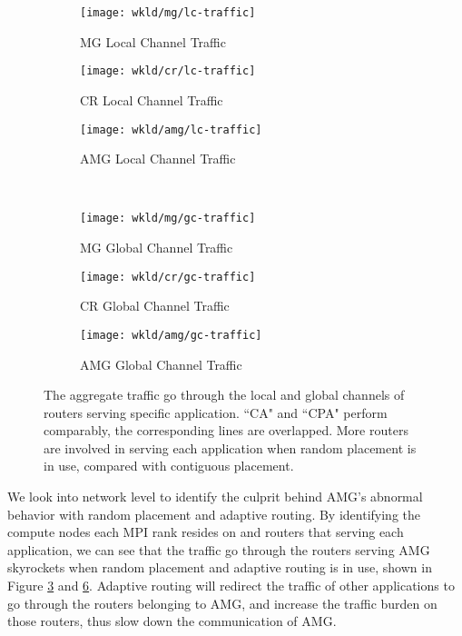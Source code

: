 \begin{figure*}[t]
    \centering
    \begin{subfigure}[t]{0.32\textwidth}
        \centering
        \texttt{[image: wkld/mg/lc-traffic]}
        \caption{MG Local Channel Traffic}
        \label{fig:mg-lc-traffic}
    \end{subfigure}\hfill
    \begin{subfigure}[t]{0.32\textwidth}
        \centering
        \texttt{[image: wkld/cr/lc-traffic]}
        \caption{CR Local Channel Traffic}
        \label{fig:cr-lc-traffic}
    \end{subfigure}\hfill
    \begin{subfigure}[t]{0.32\textwidth}
        \centering
        \texttt{[image: wkld/amg/lc-traffic]}
        \caption{AMG Local Channel Traffic}
        \label{fig:amg-lc-traffic}
    \end{subfigure}\\  
    \centering
   \begin{subfigure}[t]{0.32\textwidth}
        \centering
        \texttt{[image: wkld/mg/gc-traffic]}
        \caption{MG Global Channel Traffic}
        \label{fig:mg-gc-traffic}
    \end{subfigure}\hfill
    \begin{subfigure}[t]{0.32\textwidth}
        \centering
        \texttt{[image: wkld/cr/gc-traffic]}
        \caption{CR Global Channel Traffic}
        \label{fig:cr-gc-traffic}
    \end{subfigure}\hfill
    \begin{subfigure}[t]{0.32\textwidth}
        \centering
        \texttt{[image: wkld/amg/gc-traffic]}
        \caption{AMG Global Channel Traffic}
        \label{fig:amg-gc-traffic}
    \end{subfigure}
   \caption{The aggregate traffic go through the local and global channels of routers serving specific application. ``CA" and ``CPA" perform comparably, the corresponding lines are overlapped. More routers are involved in serving each application when random placement is in use, compared with contiguous placement.}
   \label{fig:3app-lc-gc-traffic}
\end{figure*}


We look into network level to identify the culprit behind AMG's abnormal behavior with random placement and adaptive routing. By identifying the compute nodes each MPI rank resides on and routers that serving each application, we can see that the traffic go through the routers serving AMG skyrockets when random placement and adaptive routing is in use, shown in Figure \ref{fig:amg-lc-traffic} and \ref{fig:amg-gc-traffic}. Adaptive routing will redirect the traffic of other applications to go through the routers belonging to AMG, and increase the traffic burden on those routers, thus slow down the communication of AMG.

